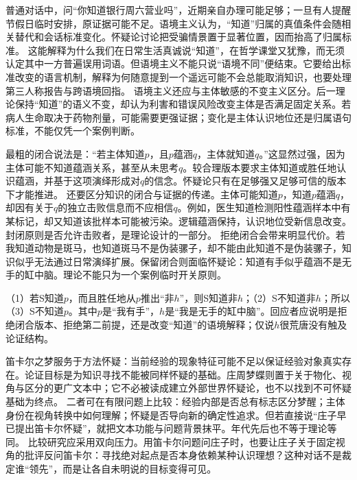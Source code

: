 普通对话中，问“你知道银行周六营业吗”，近期亲自办理可能足够；一旦有人提醒节假日临时安排，原证据可能不足。语境主义认为，“知道”归属的真值条件会随相关替代和会话标准变化\parencite{derose1992,derose2009}。怀疑论讨论把受骗情景置于显著位置，因而抬高了归属标准。 这能解释为什么我们在日常生活真诚说“知道”，在哲学课堂又犹豫，而无须认定其中一方普遍误用词语。但语境主义不能只说“语境不同”便结束。它要给出标准改变的语言机制，解释为何随意提到一个遥远可能不会总能取消知识，也要处理第三人称报告与跨语境回指。 语境主义还应与主体敏感的不变主义区分。后一理论保持“知道”的语义不变，却认为利害和错误风险改变主体是否满足固定关系。若病人生命取决于药物剂量，可能需要更强证据；变化是主体认识地位还是归属语句标准，不能仅凭一个案例判断。

最粗的闭合说法是：“若主体知道$p$，且$p$蕴涵$q$，主体就知道$q$。”这显然过强，因为主体可能不知道蕴涵关系，甚至从未思考$q$。较合理版本要求主体知道或胜任地认识蕴涵，并基于这项演绎形成对$q$的信念。怀疑论只有在足够强又足够可信的版本下才能推进。 还要区分知识的闭合与证据的传递。主体可能知道$p$，知道$p$蕴涵$q$，却因有关于$q$的独立击败信息而不应相信$q$。例如，医生知道检测阳性蕴涵样本中有某标记，却又知道该批样本可能被污染。逻辑蕴涵保持，认识地位受新信息改变。封闭原则是否允许击败者，是理论设计的一部分。 拒绝闭合会带来明显代价。若我知道动物是斑马，也知道斑马不是伪装骡子，却不能由此知道不是伪装骡子，知识似乎无法通过日常演绎扩展。保留闭合则面临怀疑论：知道有手似乎蕴涵不是无手的缸中脑。理论不能只为一个案例临时开关原则。

\begin{argumentbox}[怀疑论的标准重构]
（1）若S知道$p$，而且胜任地从$p$推出“非$h$”，则S知道非$h$；（2）S不知道非$h$；所以（3）S不知道$p$。其中$p$是“我有手”，$h$是“我是无手的缸中脑”。回应者应说明是拒绝闭合版本、拒绝第二前提，还是改变“知道”的语境解释；仅说$h$很荒唐没有触及论证结构。
\end{argumentbox}

笛卡尔之梦服务于方法怀疑：当前经验的现象特征可能不足以保证经验对象真实存在。论证目标是为知识寻找不能被同样怀疑的基础。庄周梦蝶则置于关于物化、视角与区分的更广文本中；它不必被读成建立外部世界怀疑论，也不以找到不可怀疑基础为终点\parencite{zhuangzi2009}。 二者可在有限问题上比较：经验内部是否总有标志区分梦醒；主体身份在视角转换中如何理解；怀疑是否导向新的确定性追求。但若直接说“庄子早已提出笛卡尔怀疑”，就把文本功能与问题背景抹平。年代先后也不等于理论等同。 比较研究应采用双向压力。用笛卡尔问题问庄子时，也要让庄子关于固定视角的批评反问笛卡尔：寻找绝对起点是否本身依赖某种认识理想？这种对话不是裁定谁“领先”，而是让各自未明说的目标变得可见。

